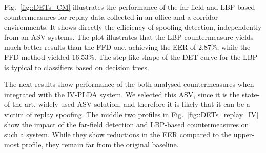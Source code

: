
Fig.~\ref{fig::DETs_CM} illustrates the performance of the far-field and LBP-based countermeasures for replay data collected in an office and a corridor environments. It shows directly the efficiency of spoofing detection, independently from an ASV systems. The plot illustrates that the LBP countermeasure yields much better results than the FFD one, achieving the EER of 2.87\%, while the FFD method yielded 16.53\%. The step-like shape of the DET curve for the LBP is typical to classifiers based on decision trees.


The next results show performance of the both analysed countermeasures when integrated with the IV-PLDA system. We selected this ASV, since it is the state-of-the-art, widely used ASV solution, and therefore it is likely that it can be a victim of replay spoofing. The middle two profiles in Fig.~\ref{fig::DETs_replay_IV} show the impact of the far-field detection and LBP-based countermeasures on such a system. While they show reductions in the EER compared to the upper-most profile, they remain far from the original baseline.




